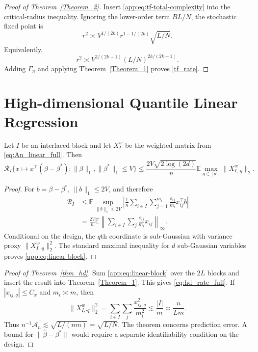 \documentclass[twoside,11pt]{article}
\newenvironment{revision}{\color{revisionred}}{}
\begin{document}
\begin{revision}
\begin{proof}[Proof of Theorem~\ref{Theorem_2}]
Insert \eqref{app:eq:tf-total-complexity} into the critical-radius inequality.
Ignoring the lower-order term $BL/N$, the stochastic fixed point is
\[
 r^2\asymp V^{1/(2k)}r^{1-1/(2k)}\sqrt{L/N}.
\]
Equivalently,
\[
 r^2\asymp V^{2/(2k+1)}(L/N)^{2k/(2k+1)}.
\]
Adding $\Gamma_n$ and applying Theorem~\ref{Theorem_1} proves
\eqref{tf_rate}.
\end{proof}


\section{High-dimensional Quantile Linear Regression}
\label{app:linear}

\begin{lemma}
\label{app:lem:linear-complexity}
Let $I$ be an interlaced block and let $X_I^w$ be the weighted matrix from
\eqref{eq:An_linear_full}.  Then
\begin{equation}
 \mathcal R_I\{x\mapsto x^\top(\beta-\beta^*):
 \|\beta\|_1,\|\beta^*\|_1\le V\}
 \le \frac{2V\sqrt{2\log(2d)}}{n}
 \mathbb E\max_{q\in[d]}\|X^w_{I,\cdot q}\|_2.                \label{app:eq:linear-block}
\end{equation}
\end{lemma}

\begin{proof}
For $b=\beta-\beta^*$, $\|b\|_1\le2V$, and therefore
\begin{align*}
 \mathcal R_I
 &\le \mathbb E\sup_{\|b\|_1\le2V}
 \left|\frac1n\sum_{i\in I}\sum_{j=1}^{m_i}
 \frac{\varepsilon_{ij}}{m_i}x_{ij}^\top b\right|\\
 &=\frac{2V}{n}\mathbb E
 \left\|\sum_{i\in I}\sum_j\frac{\varepsilon_{ij}}{m_i}x_{ij}\right\|_\infty.
\end{align*}
Conditional on the design, the $q$th coordinate is sub-Gaussian with variance
proxy $\|X^w_{I,\cdot q}\|_2^2$.  The standard maximal inequality for $d$
sub-Gaussian variables proves \eqref{app:eq:linear-block}.
\end{proof}

\begin{proof}[Proof of Theorem~\ref{thm_hd}]
Sum \eqref{app:eq:linear-block} over the $2L$ blocks and insert the result into
Theorem~\ref{Theorem_1}.  This gives \eqref{eq:hd_rate_full}.  If
$|x_{ij,q}|\le C_x$ and $m_i\asymp m$, then
\[
 \|X^w_{I,\cdot q}\|_2^2
 =\sum_{i\in I}\sum_j\frac{x_{ij,q}^2}{m_i^2}
 \lesssim\frac{|I|}{m}\asymp\frac{n}{Lm}.
\]
Thus $n^{-1}\mathcal A_n\lesssim\sqrt{L/(nm)}=\sqrt{L/N}$.
The theorem concerns prediction error.  A bound for $\|\widehat\beta-\beta^*\|$
would require a separate identifiability condition on the design.
\end{proof}



\end{revision}
\end{document}
